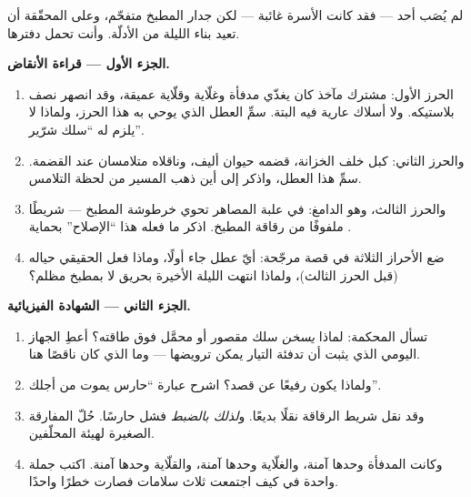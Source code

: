 \begin{problem}\label{pb:g7:short-circuits-safety:1}
لم يُصَب أحد --- فقد كانت الأسرة غائبة --- لكن جدار المطبخ
متفحّم، وعلى المحقّقة أن تعيد بناء الليلة من الأدلّة. وأنت
تحمل دفترها.

\medskip\noindent\textbf{الجزء الأول --- قراءة الأنقاض.}
\begin{enumerate}
  \item الحرز الأول: مشترك مآخذ كان يغذّي مدفأة وغلّاية
        وقلّاية عميقة، وقد انصهر نصف بلاستيكه. ولا أسلاك عارية
        فيه البتة. سمِّ العطل الذي يوحي به هذا الحرز، ولماذا
        لا يلزم له ``سلك شرّير''.
  \item والحرز الثاني: كبل خلف الخزانة، قضمه حيوان أليف،
        وناقلاه متلامسان عند القضمة. سمِّ هذا العطل، واذكر
        إلى أين ذهب المسير من لحظة التلامس.
  \item والحرز الثالث، وهو الدامغ: في علبة المصاهر تحوي خرطوشة
          المطبخ --- شريطًا ملفوفًا من رقاقة المطبخ.
        اذكر ما فعله هذا ``الإصلاح'' بحماية .
  \item ضع الأحراز الثلاثة في قصة مرجّحة: أيّ عطل جاء أولًا،
        وماذا فعل  الحقيقي حياله (قبل الحرز الثالث)،
        ولماذا انتهت الليلة الأخيرة بحريق لا بمطبخ مظلم؟
\end{enumerate}

\medskip\noindent\textbf{الجزء الثاني --- الشهادة الفيزيائية.}
\begin{enumerate}[resume]
  \item تسأل المحكمة: لماذا \emph{يسخن} سلك مقصور أو محمَّل فوق
        طاقته؟ أعطِ الجهاز اليومي الذي يثبت أن تدفئة التيار
        يمكن ترويضها --- وما الذي كان ناقصًا هنا.
  \item ولماذا يكون  رفيعًا عن قصد؟ اشرح عبارة ``حارس
        يموت من أجلك''.
  \item وقد نقل شريط الرقاقة نقلًا بديعًا. و\emph{لذلك بالضبط}
        فشل حارسًا. حُلّ المفارقة الصغيرة لهيئة المحلّفين.
  \item وكانت المدفأة وحدها آمنة، والغلّاية وحدها آمنة،
        والقلّاية وحدها آمنة. اكتب جملة واحدة في كيف اجتمعت
        ثلاث سلامات فصارت خطرًا واحدًا.
\end{enumerate}


\end{problem}
